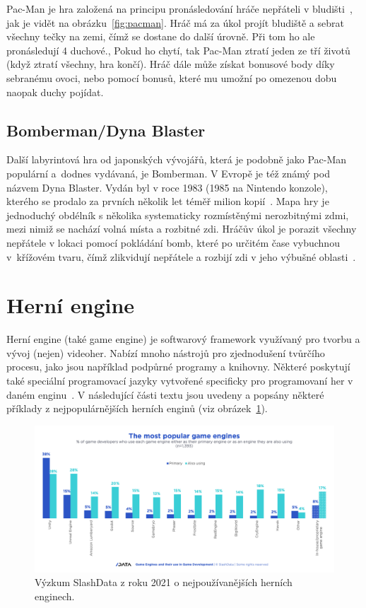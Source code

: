 Pac-Man je hra založená na principu pronásledování hráče nepřáteli v bludišti~\cite{kent2010ultimate}, jak je vidět na obrázku~\ref{fig:pacman}. Hráč má za úkol projít bludiště a sebrat všechny tečky na zemi, čímž se dostane do další úrovně. Při tom ho ale pronásledují 4 duchové., Pokud ho chytí, tak Pac-Man ztratí jeden ze tří životů (když ztratí všechny, hra končí). Hráč dále může získat bonusové body díky sebranému ovoci, nebo pomocí bonusů, které mu umožní po omezenou dobu naopak duchy pojídat.

\subsection*{Bomberman/Dyna Blaster}
Další labyrintová hra od japonských vývojářů, která je podobně jako Pac-Man populární a~dodnes vydávaná, je Bomberman. V Evropě je též známý pod názvem Dyna Blaster. Vydán byl v roce 1983 (1985 na Nintendo konzole), kterého se prodalo za prvních několik let téměř milion kopií~\cite{Bomberman}. 
Mapa hry je jednoduchý obdélník s několika systematicky rozmístěnými nerozbitnými zdmi, mezi nimiž se nachází volná místa a rozbitné zdi. Hráčův úkol je porazit všechny nepřátele v lokaci pomocí pokládání bomb, které po určitém čase vybuchnou v~křížovém tvaru, čímž zlikvidují nepřátele a rozbijí zdi v jeho výbušné oblasti~\cite{Bomberman}. 

\section{Herní engine}\label{chap:Herní engine}
Herní engine (také game engine) je softwarový framework využívaný pro tvorbu a vývoj (nejen) videoher. Nabízí mnoho nástrojů pro zjednodušení tvůrčího procesu, jako jsou například podpůrné programy a knihovny. Některé poskytují také speciální programovací jazyky vytvořené specificky pro programovaní her v daném enginu~\cite{Valencia-Garcia_2016}. V následující části textu jsou uvedeny a popsány některé příklady z nejpopulárnějších herních enginů (viz obrázek~\ref{fig:most_popular_game_engines}).
\begin{figure}[H]
    \vspace{1cm}
	\centering
	\includegraphics[width=\textwidth]{obrazky-figures/ch2/most_popular_game_engines.png}
	\caption{Výzkum SlashData z roku 2021 o nejpoužívanějších herních enginech.~\cite{SlashData_game-engines}}
	\label{fig:most_popular_game_engines}
\end{figure}

